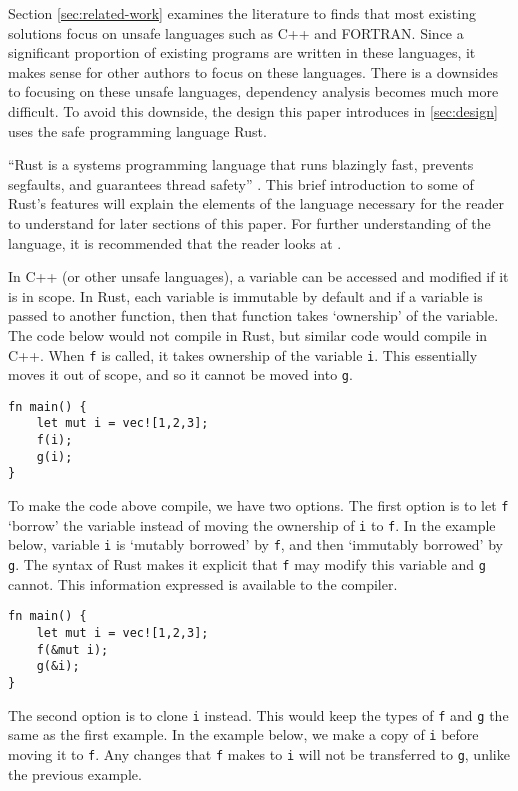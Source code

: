 \documentclass[conference]{IEEEtran}
\begin{document}
Section \ref{sec:related-work} examines the literature to finds that most existing solutions focus on unsafe languages such as C++ and FORTRAN. Since a significant proportion of existing programs are written in these languages, it makes sense for other authors to focus on these languages. There is a downsides to focusing on these unsafe languages, dependency analysis becomes much more difficult. To avoid this downside, the design this paper introduces in \autoref{sec:design} uses the safe programming language Rust.

``Rust is a systems programming language that runs blazingly fast, prevents segfaults, and guarantees thread safety'' \parencite{rustlang}. This brief introduction to some of Rust's features will explain the elements of the language necessary for the reader to understand for later sections of this paper. For further understanding of the language, it is recommended that the reader looks at \textcite{rustbook}.

In C++ (or other unsafe languages), a variable can be accessed and modified if it is in scope. In Rust, each variable is immutable by default and if a variable is passed to another function, then that function takes `ownership' of the variable. The code below would not compile in Rust, but similar code would compile in C++. When \texttt{f} is called, it takes ownership of the variable \texttt{i}. This essentially moves it out of scope, and so it cannot be moved into \texttt{g}.

\begin{verbatim}
fn main() {
    let mut i = vec![1,2,3];
    f(i);
    g(i);
}
\end{verbatim}

To make the code above compile, we have two options. The first option is to let \texttt{f} `borrow' the variable instead of moving the ownership of \texttt{i} to \texttt{f}. In the example below, variable \texttt{i} is `mutably borrowed' by \texttt{f}, and then `immutably borrowed' by \texttt{g}. The syntax of Rust makes it explicit that \texttt{f} may modify this variable and \texttt{g} cannot. This information expressed is available to the compiler.

\begin{verbatim}
fn main() {
    let mut i = vec![1,2,3];
    f(&mut i);
    g(&i);
}
\end{verbatim}

The second option is to clone \texttt{i} instead. This would keep the types of \texttt{f} and \texttt{g} the same as the first example. In the example below, we make a copy of \texttt{i} before moving it to \texttt{f}. Any changes that \texttt{f} makes to \texttt{i} will not be transferred to \texttt{g}, unlike the previous example.
\end{document}
